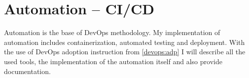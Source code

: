 \chapter{Automation -- CI/CD}\label{chap5} Automation is the base of DevOps methodology. My implementation of automation includes containerization, automated testing and deployment. With the use of DevOps adoption instruction from \ref{devops:adp} I will describe all the used tools, the implementation of the automation itself and also provide documentation.










